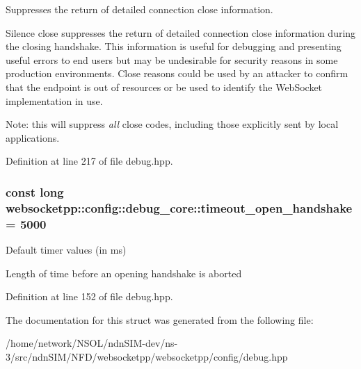 Suppresses the return of detailed connection close information. 

Silence close suppresses the return of detailed connection close information during the closing handshake. This information is useful for debugging and presenting useful errors to end users but may be undesirable for security reasons in some production environments. Close reasons could be used by an attacker to confirm that the endpoint is out of resources or be used to identify the Web\+Socket implementation in use.

Note\+: this will suppress {\itshape all} close codes, including those explicitly sent by local applications. 

Definition at line 217 of file debug.\+hpp.

\subsubsection[{\texorpdfstring{timeout\+\_\+open\+\_\+handshake}{timeout\_open\_handshake}}]{\setlength{\rightskip}{0pt plus 5cm}const long websocketpp\+::config\+::debug\+\_\+core\+::timeout\+\_\+open\+\_\+handshake = 5000\hspace{0.3cm}{\ttfamily [static]}}\hypertarget{structwebsocketpp_1_1config_1_1debug__core_a99182b8a1b9b1d62075d414705165117}{}\label{structwebsocketpp_1_1config_1_1debug__core_a99182b8a1b9b1d62075d414705165117}


Default timer values (in ms) 

Length of time before an opening handshake is aborted 

Definition at line 152 of file debug.\+hpp.



The documentation for this struct was generated from the following file\+:\begin{DoxyCompactItemize}
\item 
/home/network/\+N\+S\+O\+L/ndn\+S\+I\+M-\/dev/ns-\/3/src/ndn\+S\+I\+M/\+N\+F\+D/websocketpp/websocketpp/config/debug.\+hpp\end{DoxyCompactItemize}
